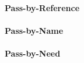 \paragraph{Pass-by-Reference}\label{par:Parameter_Passing-Pass_By_Reference}
\paragraph{Pass-by-Name}\label{par:Parameter_Passing-Pass_By_Name}
\paragraph{Pass-by-Need}\label{par:Parameter_Passing-Pass_By_Need}

